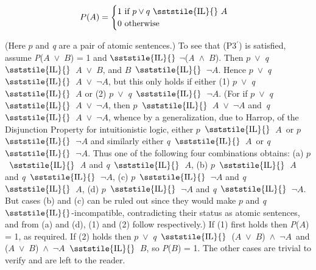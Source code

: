 \begin{equation}
P(A) = 
\begin{cases}
1 \text{ if } p \vee q~ \sststile{\mathrm{IL}}{}~ A \\
0 \text{ otherwise}
\end{cases}
\end{equation}

\noindent (Here \(p\) and \textit{q} are a pair of atomic sentences.) To see that (P3\(^\prime\)) is satisfied, assume \textit{P}(\(A\)~${\vee}$~\(B\)) = 1 and {\small \(\sststile{\mathrm{IL}}{}\)} ${\lnot}$(\textit{A~}${\wedge}$~\(B\)). Then \(p\)~${\vee}$~\textit{q}~{\small \(\sststile{\mathrm{IL}}{}\)}~\(A\)~${\vee}$~\(B\), and \(B\)~{\small \(\sststile{\mathrm{IL}}{}\)}~${\lnot}$\(A\). Hence \(p\)~${\vee}$~\textit{q}~{\small \(\sststile{\mathrm{IL}}{}\)}~\(A\)~${\vee}$~${\lnot}$\(A\), but this only holds if either (1) \(p\)~${\vee}$~\textit{q}~{\small \(\sststile{\mathrm{IL}}{}\)}~\(A\) or (2) \(p\)~${\vee}$~\textit{q}~{\small \(\sststile{\mathrm{IL}}{}\)}~${\lnot}$\(A\). (For if \(p\)~${\vee}$~\textit{q}~{\small \(\sststile{\mathrm{IL}}{}\)}~\(A\)~${\vee}$~${\lnot}$\(A\), then \(p\)~{\small \(\sststile{\mathrm{IL}}{}\)}~\(A\)~${\vee}$~${\lnot}$\(A\) and~\textit{q}~{\small \(\sststile{\mathrm{IL}}{}\)}~\(A\)~${\vee}$~${\lnot}$\(A\), whence by a generalization, due to Harrop, of the Disjunction Property for intuitionistic logic, either \(p\)~{\small \(\sststile{\mathrm{IL}}{}\)}~\(A\)~or \(p\)~{\small \(\sststile{\mathrm{IL}}{}\)}~${\lnot}$\(A\) and similarly either \textit{q}~{\small \(\sststile{\mathrm{IL}}{}\)}~\(A\)~or \textit{q}~{\small \(\sststile{\mathrm{IL}}{}\)}~${\lnot}$\(A\). Thus one of the following four combinations obtains: (a) \(p\)~{\small \(\sststile{\mathrm{IL}}{}\)}~\textit{A }and \textit{q}~{\small \(\sststile{\mathrm{IL}}{}\)}~\(A\), (b) \(p\)~{\small \(\sststile{\mathrm{IL}}{}\)}~\(A\) and \textit{q}~{\small \(\sststile{\mathrm{IL}}{}\)}~${\lnot}$\(A\), (c) \(p\)~{\small \(\sststile{\mathrm{IL}}{}\)}~${\lnot}$\(A\) and \textit{q}~{\small \(\sststile{\mathrm{IL}}{}\)}~\(A\), (d) \(p\)~{\small \(\sststile{\mathrm{IL}}{}\)}~${\lnot}$\(A\) and \textit{q}~{\small \(\sststile{\mathrm{IL}}{}\)}~${\lnot}$\(A\). But cases (b) and (c) can be ruled out since they would make \(p\) and \textit{q} {\small \(\sststile{\mathrm{IL}}{}\)}{}-incompatible, contradicting their status as atomic sentences, and from (a) and (d), (1) and (2) follow respectively.) If (1) first holds then \textit{P}(\(A\)) = 1, as required. If (2) holds then \(p\)~${\vee}$~\textit{q}~{\small \(\sststile{\mathrm{IL}}{}\)}~(\(A\)~${\vee}$~\(B\))~${\wedge}$~${\lnot}$\(A\)~and (\(A\)~${\vee}$~\(B\))~${\wedge}$~${\lnot}$\(A\)~{\small \(\sststile{\mathrm{IL}}{}\)}~\(B\), so \textit{P}(\(B\)) = 1. The other cases are trivial to verify and are left to the reader.


